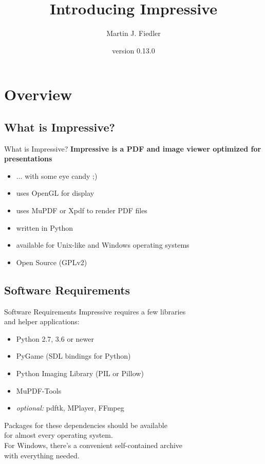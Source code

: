 \documentclass[bigger,hyperref={colorlinks=true,linkcolor=white,urlcolor=blue}]{beamer}
\title{Introducing Impressive}
\author{Martin J. Fiedler}
\date{version 0.13.0}
\begin{document}
\maketitle


\section{Overview}

\subsection{What is Impressive?}
\begin{frame}{What is Impressive?}
    \large
    \textbf{Impressive is a PDF and image viewer optimized for presentations}
    \normalsize
    \begin{itemize}
        \item ... with some eye candy ;)
        \item uses OpenGL for display
        \item uses MuPDF or Xpdf to render PDF files
        \item written in Python
        \item available for Unix-like and Windows operating systems
        \item Open Source (GPLv2)
    \end{itemize}
\end{frame}

\subsection{Software Requirements}
\begin{frame}{Software Requirements}
    Impressive requires a few libraries \\ and helper applications:
    \begin{itemize}
        \item Python 2.7, 3.6 or newer
        \item PyGame (SDL bindings for Python)
        \item Python Imaging Library (PIL or Pillow)
        \item MuPDF-Tools
        \item \emph{optional:} pdftk, MPlayer, FFmpeg
    \end{itemize}
    Packages for these dependencies should be available \\
    for almost every operating system. \\
    For Windows, there's a convenient self-contained archive \\
    with everything needed.
\end{frame}
\end{document}
